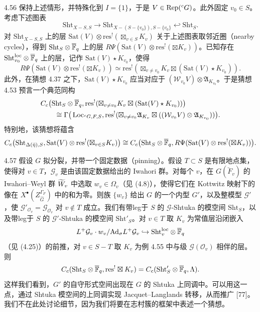 \begin{exam}{4.56}\label{thm:a2-4-56}
保持上述情形，并特殊化到 $I=\{1\}$，于是 $V\in\operatorname{Rep}({}^cG)$。此外固定 $v_0\in S$。考虑下述图表
\[
\mathrm{Sht}_{X-S,S}\to\mathrm{Sht}_{X-(S-\{v_0\}),S-\{v_0\}}\hookleftarrow\mathrm{Sht}_S.
\]
对 $\mathrm{Sht}_{X-S,S}$ 上的层 $\mathrm{Sat}(V)\otimes\mathrm{res}^!(\boxtimes_{v\in S}K_v)$ 关于上述图表取邻近圈（nearby cycles），得到 $\mathrm{Sht}_S\otimes\overline{\mathbb{F}}_q$ 上的层 $R\Psi(\mathrm{Sat}(V)\otimes\mathrm{res}^!(\boxtimes K_v))$。已知存在 $\mathrm{Sht}^{\mathrm{loc}}_{v_0}\otimes\overline{\mathbb{F}}_q$ 上的层，记作 $\mathrm{Sat}(V)\star K_{v_0}$，使得
\[
R\Psi(\mathrm{Sat}(V)\otimes\mathrm{res}^!(\boxtimes K_v))\simeq\mathrm{res}^!(\boxtimes_{v\ne v_0}K_v\boxtimes(\mathrm{Sat}(V)\star K_{v_0})).
\]
此外，在猜想 4.37 之下，$\mathrm{Sat}(V)\star K_{v_0}$ 应当对应于 $(\mathcal W_{v_0}V)\otimes\mathfrak A_{K_{v_0}}$。于是猜想 4.53 预言一个典范同构
\[
\begin{aligned}
&C_c\big(\mathrm{Sht}_S\otimes\overline{\mathbb{F}}_q,\mathrm{res}^!(\boxtimes_{v\ne v_0}K_v\boxtimes(\mathrm{Sat}(V)\star K_{v_0}))\big)\\
&\qquad\cong\Gamma\big(\operatorname{Loc}_{{}^cG,F,S},\mathrm{res}^!(\boxtimes_{v\ne v_0}\mathfrak A_{K_v}\boxtimes((\mathcal W_{v_0}V)\otimes\mathfrak A_{K_{v_0}}))\big).
\end{aligned}
\]
特别地，该猜想将蕴含
\[
C_c\big(\mathrm{Sht}_{\Delta(\bar\eta),S},\mathrm{Sat}(V)\otimes\mathrm{res}^!(\boxtimes_{v\in S}K_v)\big)\cong C_c\big(\mathrm{Sht}_S\otimes\overline{\mathbb{F}}_q,R\Psi(\mathrm{Sat}(V)\otimes\mathrm{res}^!(\boxtimes K_v))\big).
\]
\end{exam}

\begin{exam}{4.57}\label{thm:a2-4-57}
假设 $G$ 拟分裂，并带一个固定数据（pinning）。假设 $T\subset S$ 是有限地点集，使得对 $v\in T$，$\mathcal G_v$ 是由该固定数据给出的 Iwahori 群。对每个 $v$，在 $G(\breve F_v)$ 的 Iwahori–Weyl 群 $\widetilde W_v$ 中选取 $w_v\in\Omega_v$（见 (4.8)），使得它们在 Kottwitz 映射下的像在 $X^{\bullet}(Z^{\Gamma_F}_{\hat G})$ 中的和为零。则族 $\{w_v\}$ 给出 $G$ 的一个内型 $G'$，以及整模型 $\mathcal G'$，使 $\mathcal G'_{\mathcal O_v}=\mathcal G_{\mathcal O_v}$ 对 $v\notin T$ 成立。我们有带leg于 $S$ 的 $\mathcal G$-Shtuka 的模空间 $\mathrm{Sht}_S$，以及带leg于 $S$ 的 $\mathcal G'$-Shtuka 的模空间 $\mathrm{Sht}'_S$。对 $v\in T$ 取 $K_v$ 为常值层沿闭嵌入
\[
L^+\mathcal G_v\cdot w_v/\mathrm{Ad}_\sigma L^+\mathcal G_v\hookrightarrow\mathrm{Sht}^{\mathrm{loc}}_v\otimes\overline{\mathbb{F}}_q
\]
（见 (4.25)）的前推，对 $v\in S-T$ 取 $K_v$ 为例 4.55 中与级 $\mathcal G(\mathcal O_v)$ 相伴的层。则
\[
C_c(\mathrm{Sht}_S\otimes\overline{\mathbb{F}}_q,\mathrm{res}^!\boxtimes K_v)=C_c(\mathrm{Sht}'_S\otimes\overline{\mathbb{F}}_q,\Lambda).
\]
这样我们看到，$G'$ 的自守形式空间出现在 $G$ 的 Shtuka 上同调中。可以用这一点，通过 Shtuka 模空间的上同调实现 Jacquet–Langlands 转移，从而推广 [77]。我们不在此处讨论细节，因为我们将要在志村簇的框架中表述一个猜想。
\end{exam}

